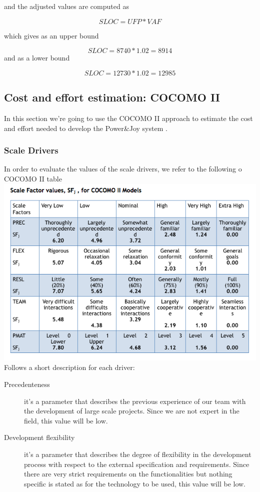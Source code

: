 \documentclass{article}
\begin{document}
\begin{flushleft}
and the adjusted values are computed as 

\[SLOC= UFP * VAF \]

which gives as an upper bound 

\[ SLOC= 8740 * 1.02 =    8914     \]
 and as a lower bound
 
 \[SLOC = 12730 * 1.02 = 12985     \]


\subsection{Cost and effort estimation: COCOMO II} %
In this section we're going to use the COCOMO II approach to estimate the cost and effort needed to develop the Power\&Joy system .



\subsubsection{Scale Drivers} %
In order to evaluate the values of the scale drivers, we refer to the following o COCOMO II table
\vspace{0.5cm}
\includegraphics[scale=0.5]{cocomo/scale}
\vspace{0.5cm}
\newpage
Follows a short description for each driver:
\begin{description}
\item[Precedenteness] it's a parameter that describes the previous experience of our team with the development of large scale projects. Since we are not expert in the field, this value will be low.
\item[Development flexibility] it's a parameter that describes the degree of flexibility in the development process with respect to the external specification and requirements. Since there are very strict requirements on the functionalities but nothing specific is stated as for the technology to be used, this value will be low.

\end{description}
\end{flushleft}
\end{document}

